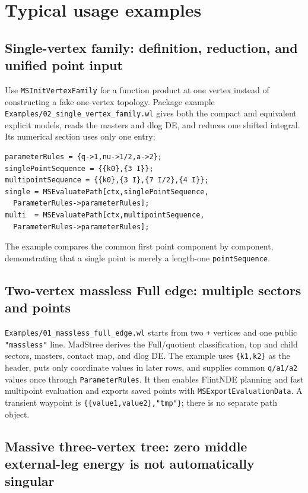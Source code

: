 \documentclass[11pt,a4paper]{article}
\begin{document}
\section{Typical usage examples}

\subsection{Single-vertex family: definition, reduction, and unified point input}

Use \texttt{MSInitVertexFamily} for a function product at one vertex instead of constructing a fake
one-vertex topology. Package example
\texttt{Examples/02\_single\_vertex\_family.wl} gives both the compact and equivalent explicit
models, reads the masters and dlog DE, and reduces one shifted integral. Its numerical section uses
only one entry:
\begin{verbatim}
parameterRules = {q->1,nu->1/2,a->2};
singlePointSequence = {{k0},{3 I}};
multipointSequence = {{k0},{3 I},{7 I/2},{4 I}};
single = MSEvaluatePath[ctx,singlePointSequence,
  ParameterRules->parameterRules];
multi  = MSEvaluatePath[ctx,multipointSequence,
  ParameterRules->parameterRules];
\end{verbatim}
The example compares the common first point component by component, demonstrating that a single
point is merely a length-one \texttt{pointSequence}.

\subsection{Two-vertex massless Full edge: multiple sectors and points}

\texttt{Examples/01\_massless\_full\_edge.wl} starts from two \texttt{+} vertices and one public
\texttt{"massless"} line. MadStree derives the Full/quotient classification, top and child sectors,
masters, contact map, and dlog DE. The example uses \texttt{\{k1,k2\}} as the header, puts only
coordinate values in later rows, and supplies common \texttt{q/a1/a2} values once through
\texttt{ParameterRules}. It then enables FlintNDE planning and fast multipoint evaluation and
exports saved points with \texttt{MSExportEvaluationData}. A transient waypoint is
\texttt{\{\{value1,value2\},"tmp"\}}; there is no separate path object.

\subsection{Massive three-vertex tree: zero middle external-leg energy is not automatically singular}
\end{document}

